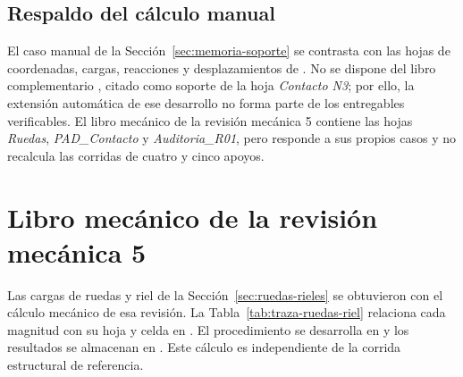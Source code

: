 \subsection{Respaldo del cálculo manual}
\label{sec:respaldo-complementario}

El caso manual de la Sección~\ref{sec:memoria-soporte} se contrasta con las hojas de coordenadas, cargas, reacciones y desplazamientos de . No se dispone del libro complementario , citado como soporte de la hoja \emph{Contacto N3}; por ello, la extensión automática de ese desarrollo no forma parte de los entregables verificables. El libro mecánico de la revisión mecánica 5 contiene las hojas \emph{Ruedas}, \emph{PAD\_Contacto} y \emph{Auditoria\_R01}, pero responde a sus propios casos y no recalcula las corridas de cuatro y cinco apoyos.

\section{Libro mecánico de la revisión mecánica 5}
\label{sec:traza-ruedas-riel}

Las cargas de ruedas y riel de la Sección~\ref{sec:ruedas-rieles} se obtuvieron con el cálculo mecánico de esa revisión. La Tabla~\ref{tab:traza-ruedas-riel} relaciona cada magnitud con su hoja y celda en . El procedimiento se desarrolla en  y los resultados se almacenan en . Este cálculo es independiente de la corrida estructural de referencia.

